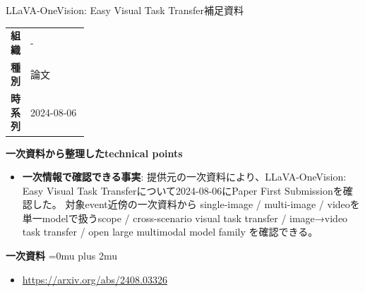 \begin{technicalnote}{LLaVA-OneVision: Easy Visual Task Transfer}{補足資料}
\begingroup
\begin{tabularx}{\linewidth}{@{}>{\bfseries}p{0.22\linewidth}X@{}}
組織 & - \\
種別 & 論文 \\
時系列 & 2024-08-06 \\
\end{tabularx}
\smallskip
{\bfseries 一次資料から整理したtechnical points}
\begin{itemize}[leftmargin=1.5em,itemsep=0.35em]
\item \textbf{一次情報で確認できる事実}: 提供元の一次資料により、LLaVA-OneVision: Easy Visual Task Transferについて2024-08-06にPaper First Submissionを確認した。 対象event近傍の一次資料から single-image / multi-image / videoを単一modelで扱うscope / cross-scenario visual task transfer / image→video task transfer / open large multimodal model family を確認できる。
\end{itemize}
\begin{minipage}{\linewidth}
\begin{samepage}
{\bfseries 一次資料}
\begingroup\sloppy
\Urlmuskip=0mu plus 2mu\relax
\begin{itemize}[leftmargin=1.5em,itemsep=0.25em]
\item {\scriptsize\url{https://arxiv.org/abs/2408.03326}}
\end{itemize}
\endgroup
\end{samepage}
\end{minipage}
\endgroup
\end{technicalnote}
\medskip

